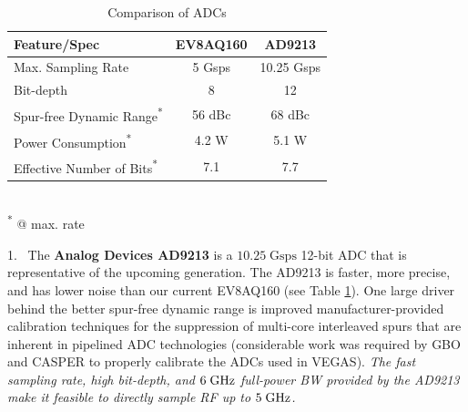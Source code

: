 \documentclass[10pt]{myNSF}
\begin{document}
\begin{table}
  \vspace{-2em}
  \centering
  \caption{Comparison of ADCs \label{table:adcs}}
  \begin{tabular}{|l|c|c|}
    \hline
    Feature/Spec & EV8AQ160 & AD9213 \\
    \hline
    Max. Sampling Rate & 5 Gsps & 10.25 Gsps \\
    Bit-depth & 8 & 12 \\
    Spur-free Dynamic Range\textsuperscript{*}  & 56 dBc & 68 dBc \\
    Power Consumption\textsuperscript{*}  & 4.2 W & 5.1 W \\
    Effective Number of Bits\textsuperscript{*}  & 7.1 & 7.7 \\
    \hline
  \end{tabular}
  \\ \textsuperscript{*} @ max. rate
\end{table}
1.~ The \textbf{Analog Devices AD9213} is a $10.25\; \mathrm{Gsps}$
12-bit ADC that is representative of the upcoming generation.  The
AD9213 is faster, more precise, and has lower noise than our current
EV8AQ160 (see Table \ref{table:adcs}).  One large driver behind the
better spur-free dynamic range is improved manufacturer-provided
calibration techniques for the suppression of multi-core interleaved
spurs that are inherent in pipelined ADC technologies (considerable
work was required by GBO and CASPER to properly calibrate the ADCs
used in VEGAS).  \emph{The fast sampling rate, high bit-depth, and
  $6\; \textrm{GHz}$ full-power BW provided by the AD9213 make it feasible to
  directly sample RF up to $5\; \textrm{GHz}$.}
\end{document}
